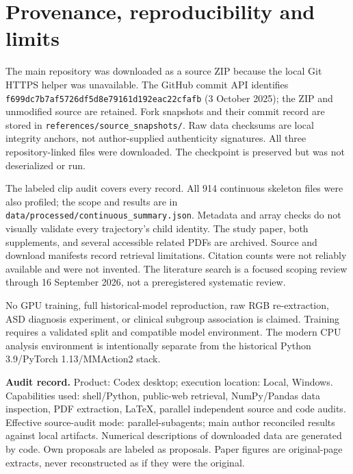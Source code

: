 \documentclass[11pt,a4paper]{article}
\newcommand{\artifact}[1]{\nolinkurl{#1}}
\begin{document}

\clearpage

\clearpage

\clearpage

\clearpage

\clearpage

\clearpage
\section{Provenance, reproducibility and limits}
The main repository was downloaded as a source ZIP because the local Git HTTPS helper was unavailable. The GitHub commit API identifies \artifact{f699dc7b7af5726df5d8e79161d192eac22cfafb} (3 October 2025); the ZIP and unmodified source are retained. Fork snapshots and their commit record are stored in \artifact{references/source_snapshots/}. Raw data checksums are local integrity anchors, not author-supplied authenticity signatures. All three repository-linked files were downloaded. The checkpoint is preserved but was not deserialized or run.

The labeled clip audit covers every record. All 914 continuous skeleton files were also profiled; the scope and results are in \artifact{data/processed/continuous_summary.json}. Metadata and array checks do not visually validate every trajectory's child identity. The study paper, both supplements, and several accessible related PDFs are archived. Source and download manifests record retrieval limitations. Citation counts were not reliably available and were not invented. The literature search is a focused scoping review through 16 September 2026, not a preregistered systematic review.

No GPU training, full historical-model reproduction, raw RGB re-extraction, ASD diagnosis experiment, or clinical subgroup association is claimed. Training requires a validated split and compatible model environment. The modern CPU analysis environment is intentionally separate from the historical Python 3.9/PyTorch 1.13/MMAction2 stack.

\textbf{Audit record.} Product: Codex desktop; execution location: Local, Windows. Capabilities used: shell/Python, public-web retrieval, NumPy/Pandas data inspection, PDF extraction, LaTeX, parallel independent source and code audits. Effective source-audit mode: parallel-subagents; main author reconciled results against local artifacts. Numerical descriptions of downloaded data are generated by code. Own proposals are labeled as proposals. Paper figures are original-page extracts, never reconstructed as if they were the original.
\end{document}
